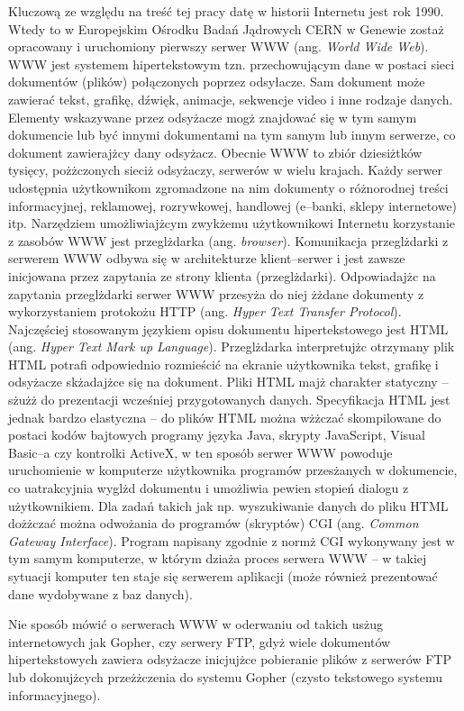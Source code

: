 Kluczową ze względu na treść tej pracy datę w historii Internetu jest rok 1990. Wtedy to w Europejskim Ośrodku
Badań Jądrowych CERN w Genewie zostaż opracowany i uruchomiony pierwszy serwer WWW (ang. \emph{World Wide Web}). WWW
jest systemem hipertekstowym tzn. przechowującym dane w postaci sieci dokumentów (plików) połączonych poprzez
odsyłacze. Sam dokument może zawierać tekst, grafikę, dźwięk, animacje,  sekwencje video i inne rodzaje danych.
Elementy wskazywane przez odsyżacze mogż znajdować się w tym samym dokumencie lub być innymi dokumentami na tym
samym lub innym serwerze, co dokument zawierajżcy dany odsyżacz. Obecnie WWW to zbiór dziesiżtków tysięcy,
pożżczonych sieciż odsyżaczy, serwerów w wielu krajach. Każdy serwer udostępnia użytkownikom zgromadzone na nim
dokumenty o różnorodnej treści informacyjnej, reklamowej, rozrywkowej, handlowej (e--banki, sklepy internetowe) itp.
Narzędziem umożliwiajżcym zwykżemu użytkownikowi Internetu korzystanie z zasobów WWW jest przeglżdarka
(ang. \emph{browser}). Komunikacja przeglżdarki z serwerem WWW odbywa się w architekturze klient--serwer i jest
zawsze inicjowana przez zapytania ze strony klienta (przeglżdarki). Odpowiadajżc na zapytania przeglżdarki serwer
WWW przesyża do niej żżdane dokumenty z wykorzystaniem protokożu HTTP (ang.
\emph{Hyper Text Transfer Protocol}). Najczęściej stosowanym językiem opisu dokumentu hipertekstowego jest HTML
(ang. \emph{Hyper Text Mark up Language}). Przeglżdarka interpretujżc otrzymany plik HTML potrafi odpowiednio rozmieścić
na ekranie użytkownika tekst, grafikę i odsyżacze skżadajżce się na dokument. Pliki HTML majż  charakter
statyczny -- sżużż do prezentacji wcześniej przygotowanych danych. Specyfikacja HTML jest jednak bardzo
elastyczna -- do plików HTML można wżżczać skompilowane do postaci kodów bajtowych programy języka Java,
skrypty JavaScript, Visual Basic--a czy kontrolki ActiveX, w ten sposób serwer WWW powoduje uruchomienie w
komputerze użytkownika  programów przesżanych w dokumencie, co uatrakcyjnia wyglżd dokumentu i umożliwia pewien
stopień dialogu z użytkownikiem. Dla zadań takich jak np. wyszukiwanie danych do pliku HTML dożżczać można
odwożania do programów (skryptów) CGI (ang. \emph{Common Gateway Interface}). Program napisany zgodnie z normż CGI
wykonywany jest w tym samym komputerze, w którym dziaża proces serwera WWW -- w takiej sytuacji komputer ten
staje się serwerem aplikacji (może również prezentować dane wydobywane z baz danych).

Nie sposób mówić o serwerach WWW w oderwaniu od takich usżug internetowych jak
Gopher, czy serwery FTP, gdyż wiele dokumentów hipertekstowych zawiera odsyżacze inicjujżce pobieranie plików z
serwerów FTP lub dokonujżcych przeżżczenia do systemu Gopher (czysto tekstowego systemu informacyjnego).

